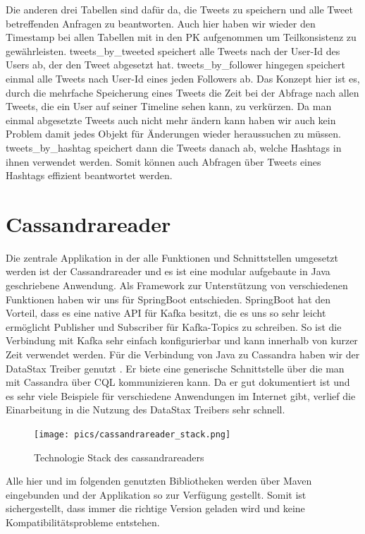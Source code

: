 Die anderen drei Tabellen sind dafür da, die Tweets zu speichern und alle Tweet betreffenden Anfragen zu beantworten. Auch hier haben wir wieder den Timestamp bei allen Tabellen mit in den PK aufgenommen um Teilkonsistenz zu gewährleisten. tweets\_by\_tweeted speichert alle Tweets nach der User-Id des Users ab, der den Tweet abgesetzt hat. tweets\_by\_follower hingegen speichert einmal alle Tweets nach User-Id eines jeden Followers ab. Das Konzept hier ist es, durch die mehrfache Speicherung eines Tweets die Zeit bei der Abfrage nach allen Tweets, die ein User auf seiner Timeline sehen kann, zu verkürzen. Da man einmal abgesetzte Tweets auch nicht mehr ändern kann haben wir auch kein Problem damit jedes Objekt für Änderungen wieder heraussuchen zu müssen. tweets\_by\_hashtag speichert dann die Tweets danach ab, welche Hashtags in ihnen verwendet werden. Somit können auch Abfragen über Tweets eines Hashtags effizient beantwortet werden.

\section{Cassandrareader}
Die zentrale Applikation in der alle Funktionen und Schnittstellen umgesetzt werden ist der Cassandrareader und es ist eine modular aufgebaute in Java geschriebene Anwendung. Als Framework zur Unterstützung von verschiedenen Funktionen haben wir uns für SpringBoot entschieden. SpringBoot hat den Vorteil, dass es eine native API für Kafka besitzt, die es uns so sehr leicht ermöglicht Publisher und Subscriber für Kafka-Topics zu schreiben. So ist die Verbindung mit Kafka sehr einfach konfigurierbar und kann innerhalb von kurzer Zeit verwendet werden. 
Für die Verbindung von Java zu Cassandra haben wir der DataStax Treiber genutzt \cite{DataStax}. Er biete eine generische Schnittstelle über die man mit Cassandra über CQL kommunizieren kann. Da er gut dokumentiert ist und es sehr viele Beispiele für verschiedene Anwendungen im Internet gibt, verlief die Einarbeitung in die Nutzung des DataStax Treibers sehr schnell.
\begin{figure}[htbp]
	\centering
	\texttt{[image: pics/cassandrareader\_stack.png]}
	\caption{Technologie Stack des cassandrareaders}
	\label{fig:techStackCass}
\end{figure}
Alle hier und im folgenden genutzten Bibliotheken werden über Maven eingebunden und der Applikation so zur Verfügung gestellt. Somit ist sichergestellt, dass immer die richtige Version geladen wird und keine Kompatibilitätsprobleme entstehen.

